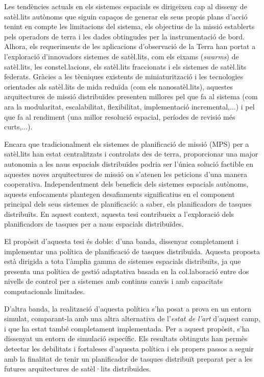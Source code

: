 \documentclass[
10pt, %
english, %
singlespacing, %
parskip, %
headsepline, %
]{MastersDoctoralThesis} %
\begin{document}
\begin{abstractca}

Les tendències actuals en els sistemes espacials es dirigeixen cap al disseny de satèl.lits autònoms que siguin capaços de generar els seus propis plans d'acció tenint en compte les limitacions del sistema, els objectius de la missió establerts pels operadors de terra i les dades obtingudes per la instrumentació de bord. Alhora, els requeriments de les aplicacions d'observació de la Terra han portat a l'exploració d'innovadors sistemes de satèl.lits, com els eixams (\emph{swarms}) de satèl.lits, les constel.lacions, els satèl.lits fraccionats i els sistemes de satèl.lits federats. Gràcies a les tècniques existents de miniaturització i les tecnologies orientades als satèl.lits de mida reduïda (com els nanosatèl.lits), aquestes arquitectures de missió distribuïdes presenten millores pel que fa al sistema (com ara la modularitat, escalabilitat, flexibilitat, implementació incremental,...) i pel que fa al rendiment (una millor resolució espacial, períodes de revisió més curts,...).

Encara que tradicionalment els sistemes de planificació de missió (MPS) per a satèl.lits han estat centralitzats i controlats des de terra, proporcionar una major autonomia a les naus espacials distribuïdes podria ser l'única solució factible en aquestes noves arquitectures de missió on s'atenen les peticions d'una manera cooperativa. Independentment dels beneficis dels sistemes espacials autònoms, aquests enfocaments plantegen desafiaments significatius en el component principal dels seus sistemes de planificació: a saber, els planificadors de tasques distribuïts. En aquest context, aquesta tesi contribueix a l'exploració dels planificadors de tasques per a naus espacials distribuïdes.

El propòsit d'aquesta tesi és doble: d'una banda, dissenyar completament i implementar una política de planificació de tasques distribuïda. Aquesta proposta està dirigida a tota l'àmplia gamma de sistemes espacials distribuïts, ja que presenta una política de gestió adaptativa basada en la col.laboració entre dos nivells de control per a sistemes amb continus canvis i amb capacitats computacionals limitades.

D'altra banda, la realització d'aquesta política s'ha posat a prova en un entorn simulat, comparant-la amb una altra alternativa de l'\emph{estat de l'art} d'aquest camp, i que ha estat també completament implementada. Per a aquest propòsit, s'ha dissenyat un entorn de simulació específic. Els resultats obtinguts han permès detectar les debilitats i fortaleses d'aquesta política i els propers passos a seguir amb la finalitat de tenir un planificador de tasques distribuït preparat per a les futures arquitectures de satèl·lits distribuïdes.

\end{abstractca}
\end{document}

